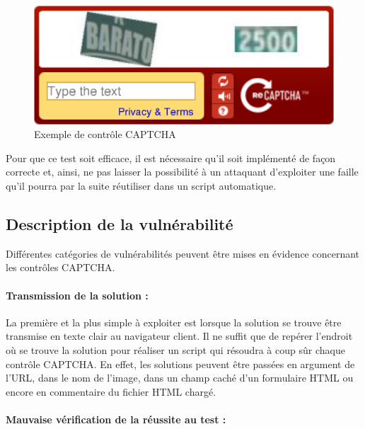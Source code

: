 \begin{figure}[!h]
\begin{center}

\includegraphics[scale=0.3]{images/captcha1.png}

\caption{Exemple de contrôle CAPTCHA}
\label{captcha1}
\end{center}
\end{figure}

Pour que ce test soit efficace, il est nécessaire qu'il soit implémenté de façon correcte et, ainsi, ne pas laisser la possibilité à un attaquant d'exploiter une faille qu'il pourra par la suite réutiliser dans un script automatique.
 

\subsection{Description de la vulnérabilité}
\label{desc_vul}

Différentes catégories de vulnérabilités peuvent être mises en évidence concernant les contrôles CAPTCHA.

\paragraph{Transmission de la solution :}

La première et la plus simple à exploiter est lorsque la solution se trouve être transmise en texte clair au navigateur client. Il ne suffit que de repérer l'endroit où se trouve la solution pour réaliser un script qui résoudra à coup sûr chaque contrôle CAPTCHA. En effet, les solutions peuvent être passées en argument de l'URL, dans le nom de l'image, dans un champ caché d'un formulaire HTML ou encore en commentaire du fichier HTML chargé. 

\paragraph{Mauvaise vérification de la réussite au test :}

